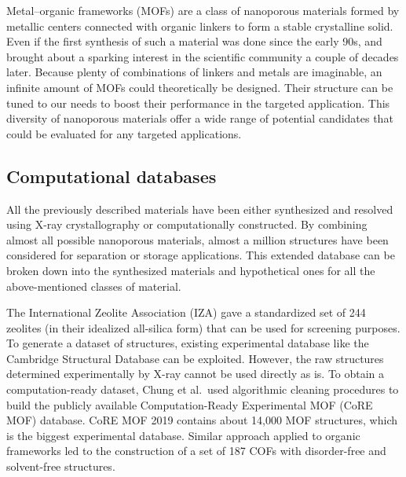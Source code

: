 \documentclass[main.tex]{subfiles}
\begin{document}
Metal--organic frameworks (MOFs) are a class of nanoporous materials formed by metallic centers connected with organic linkers to form a stable crystalline solid. Even if the first synthesis of such a material was done since the early 90s,\cite{Abrahams_1991} and brought about a sparking interest in the scientific community a couple of decades later.\cite{Kuppler_2009,Furukawa_2013} Because plenty of combinations of linkers and metals are imaginable, an infinite amount of MOFs could theoretically be designed. Their structure can be tuned to our needs to boost their performance in the targeted application.\cite{Ejsmont_2021} This diversity of nanoporous materials offer a wide range of potential candidates that could be evaluated for any targeted applications. 


\subsection{Computational databases}

All the previously described materials have been either synthesized and resolved using X-ray crystallography or computationally constructed. By combining almost all possible nanoporous materials, almost a million structures have been considered for separation or storage applications.\cite{Simon_2015,Simon_2015_EES,Thornton_2017} This extended database can be broken down into the synthesized materials and hypothetical ones for all the above-mentioned classes of material.

The International Zeolite Association (IZA) gave a standardized set of 244 zeolites (in their idealized all-silica form) that can be used for screening purposes. To generate a dataset of structures, existing experimental database like the Cambridge Structural Database can be exploited. However, the raw structures determined experimentally by X-ray cannot be used directly as is. To obtain a computation-ready dataset, Chung et al.\ used algorithmic cleaning procedures to build the publicly available Computation-Ready Experimental MOF (CoRE MOF) database.\cite{Chung_2014, Chung_2019} CoRE MOF 2019 contains about 14,000 MOF structures, which is the biggest experimental database. Similar approach applied to organic frameworks led to the construction of a set of 187 COFs with disorder-free and solvent-free structures.\cite{Tong_2017,Ongari_2019}
\end{document}
